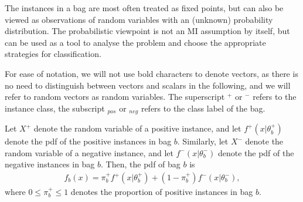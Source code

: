 The instances in a bag are most often treated as fixed points, but can also be viewed as observations of random variables with an (unknown) probability distribution. 
The probabilistic viewpoint is not an MI assumption by itself, but can be used as a tool to analyse the problem and choose the appropriate strategies for classification. 

For ease of notation, we will not use bold characters to denote vectors, as there is no need to distinguish between vectors and scalars in the following, and we will refer to random vectors as random variables.
The superscript $^+$ or $^-$ refers to the instance class, the subscript $_{pos}$ or $_{neg}$ refers to the class label of the bag. 

Let $X^+$ denote the random variable of a positive instance, and let $f^+(x|\theta_b^+)$ denote the pdf of the positive instances in bag $b$. 
Similarly, let $X^-$ denote the random variable of a negative instance, and let $f^-(x|\theta_b^-)$ denote the pdf of the negative instances in bag $b$. 
Then, the pdf of bag $b$ is
\begin{align}
  f_b(x) = \pi^+_b f^+(x|\theta_b^+) + (1-\pi^+_b)f^-(x|\theta_b^-),
\end{align}
where $0 \leq \pi^+_b \leq 1$ denotes the proportion of positive instances in bag $b$. 


